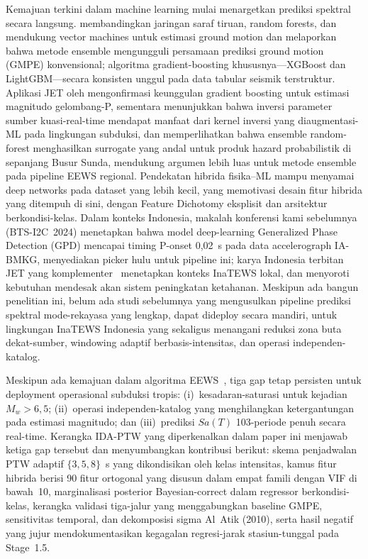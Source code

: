 \documentclass[10pt]{article}
\renewcommand{\cite}[1]{\citep{#1}}
\begin{document}
Kemajuan terkini dalam machine learning mulai menargetkan prediksi spektral secara langsung. \citet{ref82} membandingkan jaringan saraf tiruan, random forests, dan mendukung vector machines untuk estimasi ground motion dan melaporkan bahwa metode ensemble mengungguli persamaan prediksi ground motion (GMPE) konvensional; algoritma gradient-boosting khususnya---XGBoost dan LightGBM---secara konsisten unggul pada data tabular seismik terstruktur. Aplikasi JET oleh \citet{jetWang2024} mengonfirmasi keunggulan gradient boosting untuk estimasi magnitudo gelombang-P, sementara \citet{jetMa2023} menunjukkan bahwa inversi parameter sumber kuasi-real-time mendapat manfaat dari kernel inversi yang diaugmentasi-ML pada lingkungan subduksi, dan \citet{jetTsunamiRF2025} memperlihatkan bahwa ensemble random-forest menghasilkan surrogate yang andal untuk produk hazard probabilistik di sepanjang Busur Sunda, mendukung argumen lebih luas untuk metode ensemble pada pipeline EEWS regional. Pendekatan hibrida fisika--ML mampu menyamai deep networks pada dataset yang lebih kecil, yang memotivasi desain fitur hibrida yang ditempuh di sini, dengan Feature Dichotomy eksplisit dan arsitektur berkondisi-kelas. Dalam konteks Indonesia, makalah konferensi kami sebelumnya~\citet{ref81} (BTS-I2C~2024) menetapkan bahwa model deep-learning Generalized Phase Detection (GPD) mencapai timing P-onset 0,02~s pada data accelerograph IA-BMKG, menyediakan picker hulu untuk pipeline ini; karya Indonesia terbitan JET yang komplementer~\cite{jetSubekti2022, jetMukhlisin2023, jetIrwansyah2024} menetapkan konteks InaTEWS lokal, dan \citet{jetPribadi2023} menyoroti kebutuhan mendesak akan sistem peningkatan ketahanan. Meskipun ada bangun penelitian ini, belum ada studi sebelumnya yang mengusulkan pipeline prediksi spektral mode-rekayasa yang lengkap, dapat dideploy secara mandiri, untuk lingkungan InaTEWS Indonesia yang sekaligus menangani reduksi zona buta dekat-sumber, windowing adaptif berbasis-intensitas, dan operasi independen-katalog.

Meskipun ada kemajuan dalam algoritma EEWS~\cite{ref18, ref19, jetCremen2021, jetTatar2025}, tiga gap tetap persisten untuk deployment operasional subduksi tropis: (i)~kesadaran-saturasi untuk kejadian $M_w > 6,5$; (ii)~operasi independen-katalog yang menghilangkan ketergantungan pada estimasi magnitudo; dan (iii)~prediksi $Sa(T)$ 103-periode penuh secara real-time. Kerangka IDA-PTW yang diperkenalkan dalam paper ini menjawab ketiga gap tersebut dan menyumbangkan kontribusi berikut: skema penjadwalan PTW adaptif $\{3, 5, 8\}$~s yang dikondisikan oleh kelas intensitas, kamus fitur hibrida berisi 90 fitur ortogonal yang disusun dalam empat famili dengan VIF di bawah~10, marginalisasi posterior Bayesian-correct dalam regressor berkondisi-kelas, kerangka validasi tiga-jalur yang menggabungkan baseline GMPE, sensitivitas temporal, dan dekomposisi sigma Al~Atik (2010), serta hasil negatif yang jujur mendokumentasikan kegagalan regresi-jarak stasiun-tunggal pada Stage~1.5.
\end{document}
